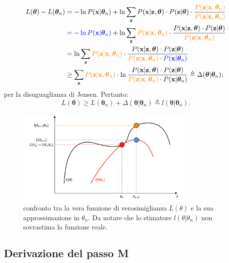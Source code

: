 \begin{equation}
	\begin{split}
		L(\boldsymbol{\theta}) - L(\boldsymbol{\theta}_n) & = -\ln P(\mathbf{x}|\boldsymbol{\theta}_n) + \ln\sum_{\mathbf{z}}^{} P(\mathbf{x}|\mathbf{z},\boldsymbol{\theta})\cdot P(\mathbf{z}|\boldsymbol{\theta})\cdot\frac{\textcolor{orange}{P(\mathbf{z}|\mathbf{x},\boldsymbol{\theta}_n)}}{\textcolor{orange}{P(\mathbf{z}|\mathbf{x},\boldsymbol{\theta}_n)}} \\
		& = \textcolor{blue}{-\ln P(\mathbf{x}|\boldsymbol{\theta}_n)} + \ln\sum_{\mathbf{z}}^{} \textcolor{orange}{P(\mathbf{z}|\mathbf{x},\boldsymbol{\theta}_n)}\cdot\frac{P(\mathbf{x}|\mathbf{z},\boldsymbol{\theta})\cdot P(\mathbf{z}|\boldsymbol{\theta})}{\textcolor{orange}{P(\mathbf{z}|\mathbf{x},\boldsymbol{\theta}_n)}} \\
		& = \ln\sum_{\mathbf{z}}^{} \textcolor{orange}{P(\mathbf{z}|\mathbf{x},\boldsymbol{\theta}_n)}\cdot\frac{P(\mathbf{x}|\mathbf{z},\boldsymbol{\theta})\cdot P(\mathbf{z}|\boldsymbol{\theta})}{\textcolor{orange}{P(\mathbf{z}|\mathbf{x},\boldsymbol{\theta}_n)}\cdot\textcolor{blue}{ P(\mathbf{x}|\boldsymbol{\theta}_n)}} \\
		& \geq\sum_{\mathbf{z}}^{}\textcolor{orange}{P(\mathbf{z}|\mathbf{x},\boldsymbol{\theta}_n)}\cdot\ln\frac{P(\mathbf{x}|\mathbf{z},\boldsymbol{\theta})\cdot P(\mathbf{z}|\boldsymbol{\theta})}{\textcolor{orange}{P(\mathbf{z}|\mathbf{x},\boldsymbol{\theta}_n)}\cdot P(\mathbf{x}|\boldsymbol{\theta}_n)} \triangleq\Delta(\boldsymbol{\theta}|\boldsymbol{\theta}_n);
	\end{split}
\end{equation}
per la disuguaglianza di Jensen. Pertanto:
\begin{equation}
	L(\boldsymbol{\theta})\geq L(\boldsymbol{\theta}_n)+\Delta(\boldsymbol{\theta}|\boldsymbol{\theta}_n)\triangleq l(\boldsymbol{\theta}|\boldsymbol{\theta}_n).
\end{equation}

\begin{figure}[htp]
	\centering
	\includegraphics[height=180px]{Immagini/Modello base/Grafico verosimiglianza}
	\caption[Confronto tra la vera funzione di verosimiglianza $L(\theta)$ e la sua approssimazione in $\theta_n$.]{confronto tra la vera funzione di verosimiglianza $L(\theta)$ e la sua approssimazione in $\theta_n$. Da notare che lo stimatore $l(\theta |\theta_n)$ non sovrastima la funzione reale.}
	\label{grafico_verosimiglianza}
\end{figure}


\subsection{Derivazione del passo M}






